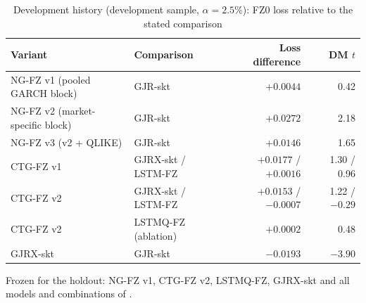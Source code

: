 \begin{table}[htbp]\centering\footnotesize
\caption{Development history (development sample, $\alpha=2.5\%$): FZ0 loss relative to the stated comparison}\label{tab:devlog}
\begin{tabular}{llrr}\toprule
Variant & Comparison & Loss difference & DM $t$ \\\midrule
NG-FZ v1 (pooled GARCH block) & GJR-skt & $+0.0044$ & 0.42 \\
NG-FZ v2 (market-specific block) & GJR-skt & $+0.0272$ & 2.18 \\
NG-FZ v3 (v2 + QLIKE) & GJR-skt & $+0.0146$ & 1.65 \\
CTG-FZ v1 & GJRX-skt / LSTM-FZ & $+0.0177$ / $+0.0016$ & 1.30 / 0.96 \\
CTG-FZ v2 & GJRX-skt / LSTM-FZ & $+0.0153$ / $-0.0007$ & 1.22 / $-0.29$ \\
CTG-FZ v2 & LSTMQ-FZ (ablation) & $+0.0002$ & 0.48 \\
GJRX-skt & GJR-skt & $-0.0193$ & $-3.90$ \\
\bottomrule\end{tabular}
\par\smallskip\parbox{\linewidth}{\scriptsize Frozen for the holdout: NG-FZ v1, CTG-FZ v2, LSTMQ-FZ, GJRX-skt and all models and combinations of \citet{agrawal2026learning}.}
\end{table}
